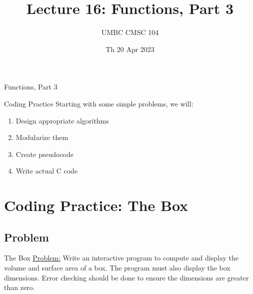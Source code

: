 \documentclass[graphics]{beamer}
\title{Lecture 16: Functions, Part 3}
\author{UMBC CMSC 104}
\date{Th 20 Apr 2023}
\begin{document}
\begin{frame}{}
\centering
    Functions, Part 3
\end{frame}

\frame{\tableofcontents}

\begin{frame}{Coding Practice}
    Starting with some simple problems, we will:
    \begin{enumerate}
        \item Design appropriate algorithms
        \item Modularize them
        \item Create pseudocode
        \item Write actual C code
    \end{enumerate}
\end{frame}

\section{Coding Practice: The Box}
\subsection{Problem}
\begin{frame}{The Box}
    \underline{Problem:} Write an interactive program to compute and display the volume and surface area of a box. The program must also display the box dimensions. Error checking should be done to ensure the dimensions are greater than zero.
\end{frame}
\end{document}
